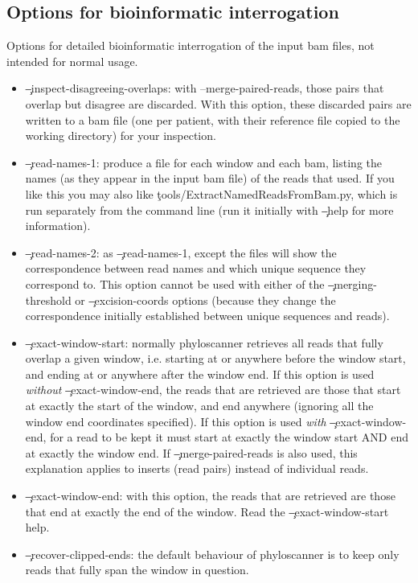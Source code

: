 \subsection{Options for bioinformatic interrogation}
Options for detailed bioinformatic interrogation of the input bam files, not intended for normal usage.
\begin{itemize}
\item \c{--inspect-disagreeing-overlaps}: with --merge-paired-reads, those pairs that overlap but disagree are discarded.
With this option, these discarded pairs are written to a bam file (one per patient, with their reference file copied to the working directory) for your inspection.
\item \c{--read-names-1}: produce a file for each window and each bam, listing the names (as they appear in the input bam file) of the reads that \p used.
If you like this you may also like \c{tools/ExtractNamedReadsFromBam.py}, which is run
separately from the command line (run it initially with \c{--help} for more information).
\item \c{--read-names-2}: as \c{--read-names-1}, except the files will show the correspondence between
read names and which unique sequence they correspond to.
This option cannot be used with either of the \c{--merging-threshold} or \c{--excision-coords} options (because they change the correspondence initially established between unique sequences and reads).
\item \c{--exact-window-start}: normally phyloscanner retrieves all reads that fully overlap a given window, i.e. starting at or anywhere before the window start, and ending at or anywhere after the window end.
If this option is used {\it without} \c{--exact-window-end}, the reads that are retrieved are those that start at exactly the start of the window, and end anywhere (ignoring all the window end coordinates specified).
If this option is used {\it with} \c{--exact-window-end}, for a read to be kept it must start at exactly the window start AND end at exactly the window end.
If \c{--merge-paired-reads} is also used, this explanation applies to inserts (read pairs) instead of individual reads.
\item \c{--exact-window-end}: with this option, the reads that are retrieved are those that end at
exactly the end of the window.
Read the \c{--exact-window-start} help.
\item \c{--recover-clipped-ends}: the default behaviour of phyloscanner is to keep only reads that fully span the window in question.

\end{itemize}
